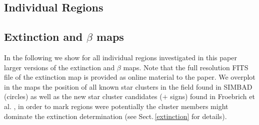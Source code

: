 \documentclass[useAMS,usenatbib]{mn2e}
\begin{document}
\begin{appendix}

\section{Individual Regions}

\subsection{Extinction and $\beta$ maps}
\label{app_images}

In the following we show for all individual regions investigated in this paper
larger versions of the extinction and $\beta$ maps. Note that the full
resolution FITS file of the extinction map is provided as online material to the
paper. We overplot in the maps the position of all known star clusters in the
field found in SIMBAD (circles) as well as the new star cluster candidates ($+$
signs) found in Froebrich et al. \cite{2006MNRAS.subm.F}, in order to mark
regions were potentially the cluster members might dominate the extinction
determination (see Sect.\,\ref{extinction} for details).


\end{appendix}
\end{document}
